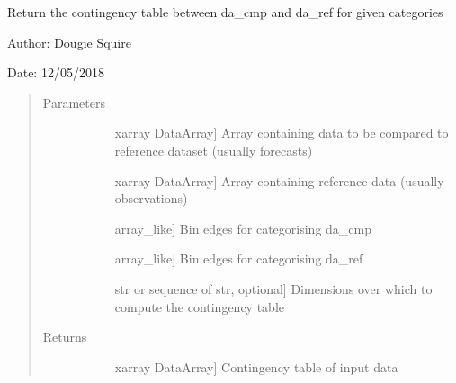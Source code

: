 \documentclass[letterpaper,10pt,english]{sphinxmanual}
\begin{document}

\begin{fulllineitems}
\label{\detokenize{skill_doc:skill.contingency}}
Return the contingency table between da\_cmp and da\_ref for given categories

\begin{DUlineblock}{0em}
\item[] Author: Dougie Squire
\item[] Date: 12/05/2018
\end{DUlineblock}
\begin{quote}\begin{description}
\item[{Parameters}] \leavevmode\begin{description}
\item[{}] \leavevmode{[}xarray DataArray{]}
Array containing data to be compared to reference dataset (usually forecasts)

\item[{}] \leavevmode{[}xarray DataArray{]}
Array containing reference data (usually observations)

\item[{}] \leavevmode{[}array\_like{]}
Bin edges for categorising da\_cmp

\item[{}] \leavevmode{[}array\_like{]}
Bin edges for categorising da\_ref

\item[{}] \leavevmode{[}str or sequence of str, optional{]}
Dimensions over which to compute the contingency table

\end{description}

\item[{Returns}] \leavevmode\begin{description}
\item[{}] \leavevmode{[}xarray DataArray{]}
Contingency table of input data

\end{description}


\end{description}
\end{quote}
\end{fulllineitems}
\end{document}
